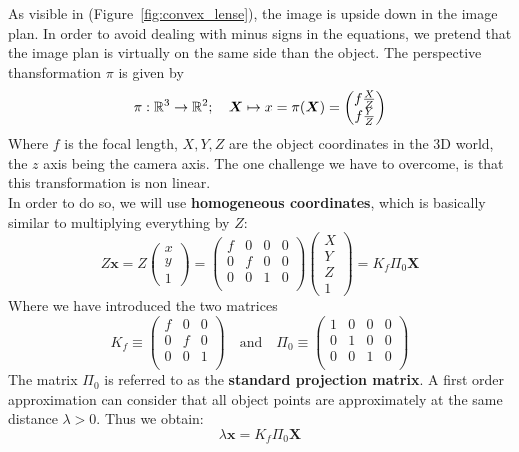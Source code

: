 As visible in (Figure~\ref{fig:convex_lense}), the image is upside down
in the image plan. In order to avoid dealing with minus signs in the
equations, we pretend that the image plan is virtually on the same
side than the object. The perspective thansformation $\pi$ is given by
\[ \pi : \mathbb{R}^3 \rightarrow \mathbb{R}^2; \quad
	\bm{X} \mapsto x = \pi(\bm{X}) =
	\begin{pmatrix}
		f \frac{X}{Z} \\
		f \frac{Y}{Z} \\
	\end{pmatrix}
\]
Where $f$ is the focal length, $X,Y,Z$ are the object coordinates
in the 3D world, the $z$ axis being the camera axis.
The one challenge we have to overcome, is that this transformation is non linear.\\

In order to do so, we will use \textbf{homogeneous coordinates},
which is basically similar to multiplying everything by $Z$:
\[ Z \bm{x} = Z \begin{pmatrix} x \\ y \\ 1 \end{pmatrix} =
	\begin{pmatrix}
		f & 0 & 0 & 0 \\
		0 & f & 0 & 0 \\
		0 & 0 & 1 & 0 \\
	\end{pmatrix}
	\begin{pmatrix}
		X \\ Y \\ Z \\ 1
	\end{pmatrix}
	= K_f \Pi_0 \bm{X}
\]
Where we have introduced the two matrices
\[K_f \equiv
	\begin{pmatrix}
		f & 0 & 0 \\
		0 & f & 0 \\
		0 & 0 & 1 \\
	\end{pmatrix}
	\quad \text{and} \quad
	\Pi_0 \equiv
	\begin{pmatrix}
		1 & 0 & 0 & 0 \\
		0 & 1 & 0 & 0 \\
		0 & 0 & 1 & 0 \\
	\end{pmatrix}
\]
The matrix $\Pi_0$ is referred to as the \textbf{standard projection matrix}.
A first order approximation can consider that all object points
are approximately at the same distance $\lambda > 0$. Thus we obtain:
\[\lambda \bm{x} = K_f \Pi_0 \bm{X}\]

